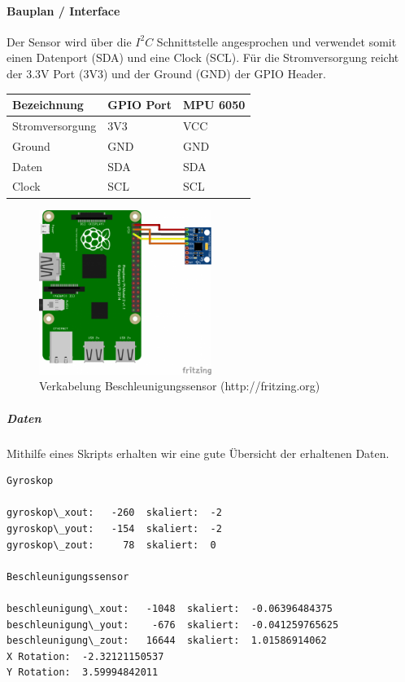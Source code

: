 \documentclass[../../main.tex]{subfiles}
\begin{document}
\paragraph{Bauplan / Interface}
Der Sensor wird über die $I^2C$ Schnittstelle angesprochen und verwendet somit einen Datenport (SDA) und eine Clock (SCL). Für die Stromversorgung reicht der 3.3V Port (3V3) und der Ground (GND) der GPIO Header.

\begin{table}[H]
\begin{center}
\begin{tabular}{lll}
Bezeichnung     & GPIO Port & MPU 6050 \\ \hline
Stromversorgung & 3V3      & VCC      \\ \hline
Ground          & GND      & GND      \\ \hline
Daten          & SDA      & SDA       \\ \hline
Clock          & SCL      & SCL       \\ \hline
\end{tabular}
\end{center}
\end{table}

\begin{figure}[H] \centering
  \includegraphics[width=0.5\textwidth, angle=90]{Verkabelung_BeschlSensor}
  \caption{Verkabelung Beschleunigungssensor (http://fritzing.org)}
  \label{fig:Beschleunigungssensor}
\end{figure}

\subparagraph{Daten}
Mithilfe eines Skripts erhalten wir eine gute Übersicht der erhaltenen Daten.

\begin{lstlisting}
Gyroskop

gyroskop\_xout:   -260  skaliert:  -2
gyroskop\_yout:   -154  skaliert:  -2
gyroskop\_zout:     78  skaliert:  0

Beschleunigungssensor

beschleunigung\_xout:   -1048  skaliert:  -0.06396484375
beschleunigung\_yout:    -676  skaliert:  -0.041259765625
beschleunigung\_zout:   16644  skaliert:  1.01586914062
X Rotation:  -2.32121150537
Y Rotation:  3.59994842011
\end{lstlisting}
\end{document}

